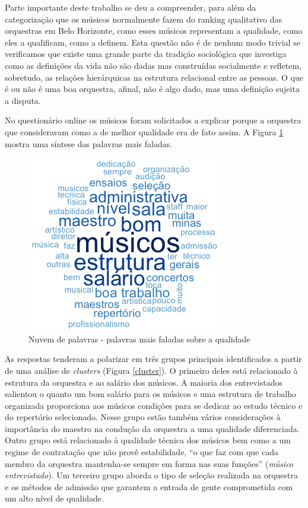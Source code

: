\documentclass[a4paper, 12pt, openright, oneside, german, french, english, brazil]{abntex2}
\begin{document}
	Parte importante deste trabalho se deu a compreender, para além da categorização que os músicos normalmente fazem do ranking qualitativo das orquestras em Belo Horizonte, como esses músicos representam a qualidade, como eles a qualificam, como a definem. Esta questão não é de nenhum modo trivial se verificamos que existe uma grande parte da tradição sociológica que investiga como as definições da vida não são dadas mas construídas socialmente e refletem, sobretudo, as relações hierárquicas na estrutura relacional entre as pessoas. O que é ou não é uma boa orquestra, afinal, não é algo dado, mas uma definição sujeita a disputa. 
	
	No questionário online os músicos foram solicitados a explicar porque a orquestra que consideravam como a de melhor qualidade era de fato assim. A Figura \ref{wordcloud} mostra uma síntese das palavras mais faladas.
	
	\begin{figure}[!ht]
		\centering
		\caption{Nuvem de palavras - palavras mais faladas sobre a qualidade}
		\label{wordcloud}
		\includegraphics[scale=.8]{qualidade_wordcloud.png}
	\end{figure}
	
	As respostas tenderam a polarizar em três grupos principais identificados a partir de uma análise de \textit{clusters} (Figura \ref{cluster}). O primeiro deles está relacionado à estrutura da orquestra e ao salário dos músicos. A maioria dos entrevistados salientou o quanto um bom salário para os músicos e uma estrutura de trabalho organizada proporciona aos músicos condições para se dedicar ao estudo técnico e do repertório selecionado. Nesse grupo estão também vários considerações à importância do maestro na condução da orquestra a uma qualidade diferenciada. Outro grupo está relacionado à qualidade técnica dos músicos bem como a um regime de contratação que não provê estabilidade, ``o que faz com que cada membro da orquestra mantenha-se sempre em forma nas suas funções'' (\textit{músico entrevistado}). Um terceiro grupo aborda o tipo de seleção realizada na orquestra e os métodos de admissão que garantem a entrada de gente comprometida com um alto nível de qualidade.
	
\end{document}
